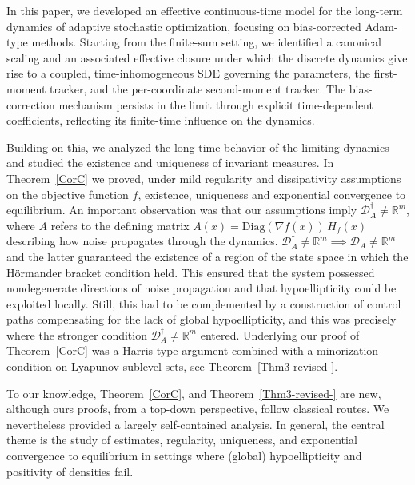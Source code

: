 \documentclass[11pt, a4paper,leqno]{amsart}
\theoremstyle{definition}
\numberwithin{equation}{section}
\begin{document}
In this paper, we developed an effective continuous-time model for the long-term dynamics of adaptive stochastic optimization, focusing on bias-corrected Adam-type methods. Starting from the finite-sum setting, we identified a canonical scaling and an associated effective closure under which the discrete dynamics give rise to a coupled, time-inhomogeneous SDE governing the parameters, the first-moment tracker, and the per-coordinate second-moment tracker. The bias-correction mechanism persists in the limit through explicit time-dependent coefficients, reflecting its finite-time influence on the dynamics.

Building on this, we analyzed the long-time behavior of the limiting dynamics and studied the existence and uniqueness of invariant measures.  In Theorem~\ref{CorC} we proved, under mild regularity and dissipativity assumptions on the objective function $f$, existence, uniqueness and exponential convergence to equilibrium. An important observation was that our assumptions imply $\mathcal D_A^\dagger \neq \mathbb R^m$, where $A$ refers to the defining matrix $A(x)=\mathrm{Diag}(\nabla f(x))\,H_f(x)$ describing how noise propagates through the dynamics.  $\mathcal D_A^\dagger \neq \mathbb R^m\implies \mathcal D_A \neq \mathbb R^m$ and the latter guaranteed the existence of a region of the state space in which the H\"ormander bracket condition held. This ensured that the system possessed nondegenerate directions of noise propagation and that hypoellipticity could be exploited locally. Still, this had to be complemented by a construction of control paths compensating for the lack of global hypoellipticity, and this was precisely where the stronger condition $\mathcal D_A^\dagger \neq \mathbb R^m$ entered. Underlying our proof of Theorem~\ref{CorC} was a Harris-type argument combined with a minorization condition on Lyapunov sublevel sets, see Theorem~\ref{Thm3-revised-}.

To our knowledge,  Theorem~\ref{CorC}, and Theorem~\ref{Thm3-revised-} are new, although ours proofs, from a top-down perspective, follow classical routes. We nevertheless provided a largely self-contained analysis. In general, the central theme is the study of estimates, regularity, uniqueness, and exponential convergence to equilibrium in settings where (global) hypoellipticity and positivity of densities fail.
\end{document}
